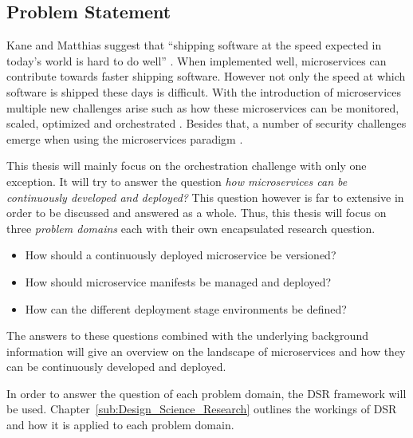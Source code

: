 
\subsection{Problem Statement}%
\label{sub:Problem_Statement}

Kane and Matthias suggest that \enquote{shipping software at the speed expected
in today's world is hard to do well} \autocite[p.
2]{SeanPKaneDocker&Running2018}. When implemented well, microservices can
contribute towards faster shipping software. However not only the speed at
which software is shipped these days is difficult. With the introduction of
microservices multiple new challenges arise such as how these microservices can
be monitored, scaled, optimized and orchestrated \autocite[p.
67]{TrihinasDevOpsasService2018}. Besides that, a number of security challenges
emerge when using the microservices paradigm
\autocite{YaryginaOvercomingSecurityChallenges2018}.

This thesis will mainly focus on the orchestration challenge with only one
exception. It will try to answer the question \textit{how microservices can be
continuously developed and deployed?} This question however is far to extensive
in order to be discussed and answered as a whole. Thus, this thesis will focus
on three  \textit{problem domains} each with their own encapsulated research
question.

\label{link:problem_domains}
\begin{itemize}
  \item How should a continuously deployed microservice be versioned?
  \item How should microservice manifests be managed and deployed?
  \item How can the different deployment stage environments be defined?
\end{itemize}

The answers to these questions combined with the underlying background
information will give an overview on the landscape of microservices and how
they can be continuously developed and deployed.

In order to answer the question of each problem domain, the \ac{DSR} framework
will be used. Chapter~\ref{sub:Design_Science_Research} outlines the workings
of \ac{DSR} and how it is applied to each problem domain.
